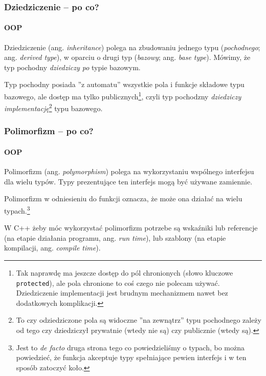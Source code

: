 \documentclass[aspectratio=169,10pt]{beamer}
\begin{document}
\begin{frame}
    \frametitle{Dziedziczenie -- po co?}
    \framesubtitle{OOP}

    Dziedziczenie (ang. \emph{inheritance}) polega na zbudowaniu jednego typu
    (\emph{pochodnego}; ang.  \emph{derived type}), w oparciu o drugi typ
    (\emph{bazowy}; ang. \emph{base type}). Mówimy, że typ pochodny
    \emph{dziedziczy po} typie bazowym.

    \vspace{1em}

    Typ pochodny posiada ''z automatu'' wszystkie pola i funkcje składowe typu
    bazowego, ale dostęp ma tylko publicznych\footnote{Tak naprawdę ma jeszcze
    dostęp do pól chronionych (słowo kluczowe {\tt protected}), ale pola
    chronione to coś czego nie polecam używać. Dziedziczenie implementacji jest
    brudnym mechanizmem nawet bez dodatkowych komplikacji.}, czyli typ pochodzny
    \emph{dziedziczy implementację}\footnote{To czy odziedziczone pola są
    widoczne ''na zewnątrz'' typu pochodnego zależy od tego czy dziedziczył
    prywatnie (wtedy nie są) czy publicznie (wtedy są).} typu bazowego.
\end{frame}

\begin{frame}
    \frametitle{Polimorfizm -- po co?}
    \framesubtitle{OOP}

    Polimorfizm (ang. \emph{polymorphism}) polega na wykorzystaniu wspólnego
    interfejsu dla wielu typów. Typy prezentujące ten interfejs mogą być używane
    zamiennie.

    \vspace{1em}

    Polimorfizm w odniesieniu do funkcji oznacza, że może ona działać na wielu
    typach.\footnote{Jest to \emph{de facto} druga strona tego co powiedzieliśmy
    o typach, bo można powiedzieć, że funkcja akceptuje typy spełniające pewien
    interfejs i w ten sposób zatoczyć koło.}

    \vspace{1em}

    W C++ żeby móc wykorzystać polimorfizm potrzebe są wskaźniki lub referencje
    (na etapie działania programu, ang. \emph{run time}), lub szablony (na
    etapie kompilacji, ang. \emph{compile time}).
\end{frame}
\end{document}
